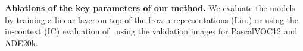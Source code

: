 \begin{table}[!tb]
\caption{\textbf{Ablations of the key parameters of our method.} We evaluate the models by training a linear layer on top of the frozen representations (Lin.) or using the in-context (IC) evaluation of~\citet{balazevic2024towards} using the validation images for PascalVOC12 and ADE20k.}
\setlength{\tabcolsep}{3pt}
    \centering
    \begin{subtable}[t]{.43\textwidth}
        \centering
        
    \end{subtable}
    \begin{subtable}[t]{0.43\textwidth}
        \centering
        
    \end{subtable}
    \par \vspace{5mm} %
    \begin{subtable}[t]{0.42\textwidth}
        \centering
        
    \end{subtable}
    \begin{subtable}[t]{0.42\textwidth}
        \centering
        
    \end{subtable}
    \par \vspace{5mm} %
    \begin{subtable}[t]{0.42\textwidth}
        \centering
        
    \end{subtable}
    \begin{subtable}[t]{0.42\textwidth}
        \centering
        
    \end{subtable}
\end{table}